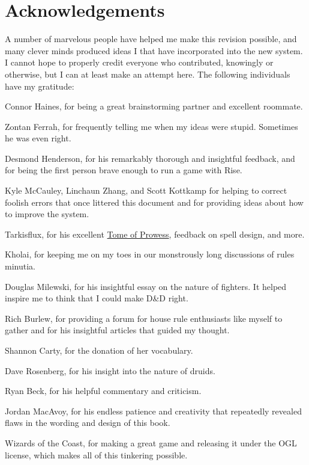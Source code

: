 \chapter*{Acknowledgements}
A number of marvelous people have helped me make this revision possible, and many clever minds produced ideas I that have incorporated into the new system. I cannot hope to properly credit everyone who contributed, knowingly or otherwise, but I can at least make an attempt here. The following individuals have my gratitude:

Connor Haines, for being a great brainstorming partner and excellent roommate.

Zontan Ferrah, for frequently telling me when my ideas were stupid. Sometimes he was even right.

Desmond Henderson, for his remarkably thorough and insightful feedback, and for being the first person brave enough to run a game with Rise.

Kyle McCauley, Linchaun Zhang, and Scott Kottkamp for helping to correct foolish errors that once littered this document and for providing ideas about how to improve the system.

Tarkisflux, for his excellent \href{http://dnd-wiki.org/wiki/Tome_of_Prowess_(3.5e_Sourcebook)}{Tome of Prowess}, feedback on spell design, and more.

Kholai, for keeping me on my toes in our monstrously long discussions of rules minutia.

Douglas Milewski, for his insightful essay on the nature of fighters. It helped inspire me to think that I could make D\&D right.

Rich Burlew, for providing a forum for house rule enthusiasts like myself to gather and for his insightful articles that guided my thought.

Shannon Carty, for the donation of her vocabulary.

Dave Rosenberg, for his insight into the nature of druids.

Ryan Beck, for his helpful commentary and criticism.

Jordan MacAvoy, for his endless patience and creativity that repeatedly revealed flaws in the wording and design of this book.

Wizards of the Coast, for making a great game and releasing it under the OGL license, which makes all of this tinkering possible.
